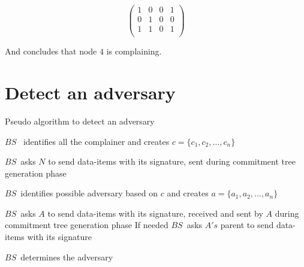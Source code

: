 	\[ 
		\left( 
			\begin{array}{cccc}
				1 & 0 & 0 & 1 \\ 
				0 & 1 & 0 & 0 \\
				\hline
				1 & 1 & 0 & 1 \\
			\end{array}
		\right)
	\]

	And concludes that node $4 $ is complaining.
\newpage
\section{Detect an adversary}
\begin{algorithm}
\caption{Pseudo algorithm to detect an adversary}

	\begin{algorithmic}[1]

			\STATE $BS$ \ identifies all the complainer and creates $c = \{c_{1}, c_{2}, \dotsc, c_{n}\}$

				\STATE $BS$\ asks $N$ to send data-items with its signature, sent during commitment tree generation phase
			
			\ENDFOR

			\STATE $BS$\ identifies possible adversary based on $c$ and creates $a = \{a_{1},a_{2},\dotsc,a_{n}\}$


				\STATE $BS$\ asks $A$ to send data-items with its signature, received and sent by $A$ during commitment tree generation phase
				\STATE If needed $BS$\  asks $A's$ parent to send data-items with its signature
	
			\ENDFOR

			\STATE $BS$\ determines the adversary 

	\end{algorithmic}
\end{algorithm}